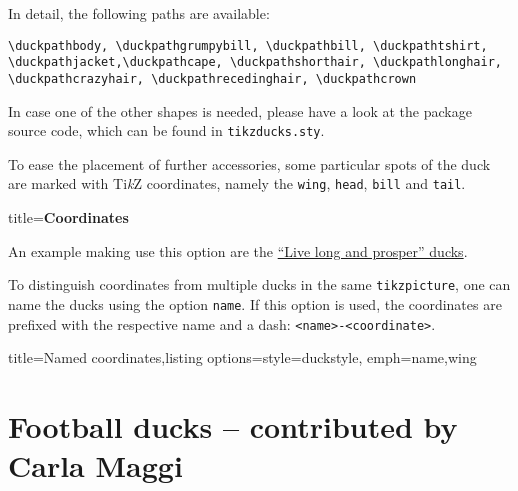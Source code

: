 \documentclass[parskip=half]{scrartcl}
\newcommand{\TikZ}{Ti\emph{k}Z\xspace}
\begin{document}
In detail, the following paths are available:

\begin{lstlisting}[aboveskip=1.2em,breakindent=0pt]
\duckpathbody, \duckpathgrumpybill, \duckpathbill, \duckpathtshirt, \duckpathjacket,\duckpathcape, \duckpathshorthair, \duckpathlonghair, \duckpathcrazyhair, \duckpathrecedinghair, \duckpathcrown
\end{lstlisting}

In case one of the other shapes is needed, please have a look at the package source code, which can be found in \lstinline|tikzducks.sty|.

To ease the placement of further accessories, some particular spots of the duck are marked with \TikZ coordinates, namely the \lstinline|wing|, \lstinline|head|, \lstinline|bill| and \lstinline|tail|. 

{
\footnotesize\ttfamily
\begin{tcblisting}{title={\normalfont\normalsize\bfseries Coordinates}}
\end{tcblisting}
}
An example making use this option are the \hyperref[starducks]{``Live long and prosper'' ducks}. 

To distinguish coordinates from multiple ducks in the same \lstinline|tikzpicture|, one can name the ducks using the option \lstinline[emph={name}]|name|. If this option is used, the coordinates are prefixed with the respective name and a dash: \lstinline|<name>-<coordinate>|.

\begin{tcblisting}{title={Named coordinates},listing options={style={duckstyle}, emph={name,wing}}}
\end{tcblisting}

\clearpage
\section{Football ducks -- contributed by Carla Maggi}
\label{sec:footballducks}
\end{document}
